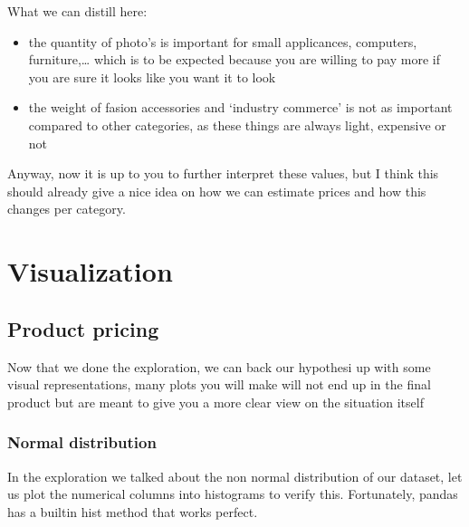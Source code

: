 \documentclass[letterpaper,10pt,english]{jupyterBook}
\begin{document}
\sphinxAtStartPar
What we can distill here:
\begin{itemize}
\item {} 
\sphinxAtStartPar
the quantity of photo’s is important for small applicances, computers, furniture,… which is to be expected because you are willing to pay more if you are sure it looks like you want it to look

\item {} 
\sphinxAtStartPar
the weight of fasion accessories and ‘industry commerce’ is not as important compared to other categories, as these things are always light, expensive or not

\end{itemize}

\sphinxAtStartPar
Anyway, now it is up to you to further interpret these values, but I think this should already give a nice idea on how we can estimate prices and how this changes per category.


\section{Visualization}
\label{\detokenize{c7_case_studies/Olist:visualization}}

\subsection{Product pricing}
\label{\detokenize{c7_case_studies/Olist:id2}}
\sphinxAtStartPar
Now that we done the exploration, we can back our hypothesi up with some visual representations, many plots you will make will not end up in the final product but are meant to give you a more clear view on the situation itself


\subsubsection{Normal distribution}
\label{\detokenize{c7_case_studies/Olist:id3}}
\sphinxAtStartPar
In the exploration we talked about the non normal distribution of our dataset, let us plot the numerical columns into histograms to verify this. Fortunately, pandas has a built\sphinxhyphen{}in hist method that works perfect.

\begin{sphinxVerbatim}[commandchars=\\\{\}]
 
\end{sphinxVerbatim}
\end{document}

